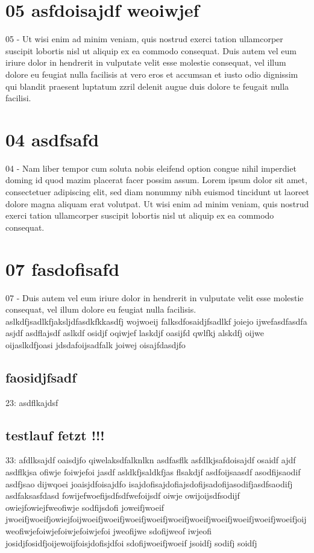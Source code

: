 \documentclass[11pt]{article}
\begin{document}
\section{05 asfdoisajdf  weoiwjef}
\label{sec:org45a072c}
05 - Ut wisi enim ad minim veniam, quis nostrud exerci tation ullamcorper
suscipit lobortis nisl ut aliquip ex ea commodo consequat. Duis autem
vel eum iriure dolor in hendrerit in vulputate velit esse molestie
consequat, vel illum dolore eu feugiat nulla facilisis at vero eros et
accumsan et iusto odio dignissim qui blandit praesent luptatum zzril
delenit augue duis dolore te feugait nulla facilisi.
\section{04 asdfsafd}
\label{sec:org15fc987}
04 - Nam liber tempor cum soluta nobis eleifend option congue nihil
imperdiet doming id quod mazim placerat facer possim assum. Lorem
ipsum dolor sit amet, consectetuer adipiscing elit, sed diam nonummy
nibh euismod tincidunt ut laoreet dolore magna aliquam erat volutpat.
Ut wisi enim ad minim veniam, quis nostrud exerci tation ullamcorper
suscipit lobortis nisl ut aliquip ex ea commodo consequat.
\section{07 fasdofisafd}
\label{sec:orge622608}
07 - Duis autem vel eum iriure dolor in hendrerit in vulputate velit esse molestie consequat, vel illum dolore eu feugiat nulla facilisis.   aslkdfjsadlkfjaksljdfasdkfkkasdfj wojwoeij falksdfosaidjfsadlkf joiejo ijwefasdfasdfa asjdf
asdflajsdf aslkdf osidjf oqiwjef laskdjf oasijfd qwlfkj alskdfj oijwe oijaslkdfjoasi jdsdafoijsadfalk joiwej oisajfdasdjfo
\subsection{faosidjfsadf}
\label{sec:orgf3283f8}
23: asdflkajdsf
\subsection{testlauf fetzt !!!}
\label{sec:orgc7c5bb8}
33: afdlksajdf oaisdjfo qiwelaksdfalknlkn
asdfasflk asfdlkjsafdoisajdf osaidf
ajdf asdflkjsa ofiwje foiwjefoi jasdf
asldkfjsaldkfjas flsakdjf asdfoijsaasdf
asodfijsaodif asdfjsao dijwqoei joaisjdfoisajdfo isajdofisajdofiajsdofijsadofijasodifjasdfsaodifj
asdfaksasfdasd fowijefwoefijsdfsdfwefoijsdf oiwje owijoijsdfsodijf owiejfowiejfweofiwje sodfijsdofi joweifjwoeif jwoeifjwoeifjowiejfoijwoeifjwoeifjwoeifjwoeifjwoeifjwoeifjwoeifjwoeifjwoeifjwoeifjoijweofiwjefoiwjefoiwjefoiwjefoi jweofijwe sdofijweof iwjeofi josidjfosidfjoijewoijfoisjdofisjdfoi sdofijwoeifjwoeif jsoidfj sodifj soidfj
\end{document}
